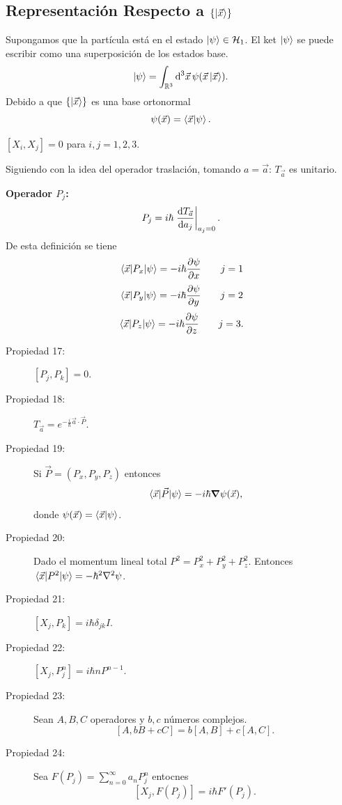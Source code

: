 \subsection{Representación Respecto a $\{ \ket{\vec{x}} \}$}
Supongamos que la partícula está en el estado $\ket{\psi}\in \mathcal{H} _1$. El ket $\ket{\psi}$ se puede escribir como una superposición de los estados base.
    $$ \ket{\psi} = \int _{\mathbb{R} ^3} \dd{^3  \vec{x}} \psi (\vec{x} \ket{\vec{x}}). $$
Debido a que $\{ \ket{\vec{x}} \}$ es una base ortonormal
    $$ \psi (\vec{x}) = \braket{\vec{x}}{\psi}. $$

\begin{description}
    \item[Propiedad 15: ] $[X_i ,X_j] = 0$ para $i,j = 1,2,3$. 
    \item[Propiedad 16: ] Siguiendo con la idea del operador traslación, tomando $a = \vec{a}$: $T_{\vec{a}}$ es unitario.
    \item 
\end{description}


\begin{definition}
    \textbf{Operador $P_j$:} \\
        $$ P_j = i\hbar \eval{\dv{T_{\vec{a}}}{a_j}} _{a_j = 0}. $$
    De esta definición se tiene
        $$ \mel{\vec{x}}{P_x}{\psi} = -i\hbar \pdv{\psi}{x} \qquad j = 1 $$
        $$ \mel{\vec{x}}{P_y}{\psi} = -i\hbar \pdv{\psi}{y} \qquad j = 2 $$
        $$ \mel{\vec{x}}{P_z}{\psi} = -i\hbar \pdv{\psi}{z} \qquad j = 3. $$
\end{definition}


\begin{description}
    \item[Propiedad 17: ] $[P_j,P_k] = 0 $.
    \item[Propiedad 18: ] $T_{\vec{a}} = e^{-\frac{i}{\hbar} \vec{a} \cdot \vec{P}}.$ 
    \item[Propiedad 19: ] Si $\vec{P} = (P_x,P_y,P_z)$ entonces
        $$ \mel{\vec{x}}{\vec{P}}{\psi} = -i\hbar \grad{\psi (\vec{x})}, $$
    donde $\psi (\vec{x}) = \braket{\vec{x}}{\psi}$.
    \item[Propiedad 20: ] Dado el momentum lineal total $P^2 = P_x ^2 + P_y ^2 + P_z ^2$. Entonces $\mel{\vec{x}}{P^2}{\psi} = -\hbar ^2 \laplacian{\psi}$.
    \item[Propiedad 21: ] $[X_j, P_k] = i\hbar \delta _{jk} I$. 
    \item[Propiedad 22: ] $[X_j ,P_j ^n] = i\hbar n P^{n - 1}$.
    \item[Propiedad 23: ] Sean $A,B,C$ operadores y $b,c$ números complejos.
        $$ [A,bB + cC] = b[A,B] + c[A,C]. $$
    \item[Propiedad 24: ] Sea $F(P_j) = \sum _{n=0} ^\infty a_n P_j ^n$ entocnes
        $$ [X_j ,F(P_j)] = i\hbar F' (P_j). $$
\end{description}


